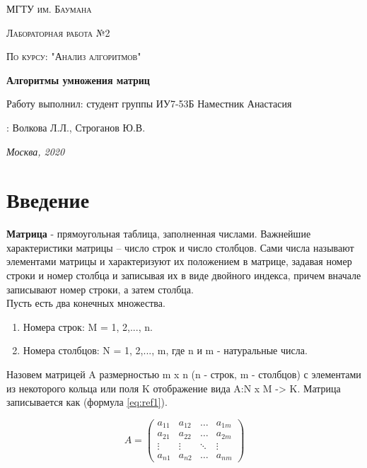 \documentclass[12pt]{report}
\begin{document}
 
\begin{titlepage}
	\centering
	{\scshape\LARGE МГТУ им. Баумана \par}
	\vspace{3cm}
	{\scshape\Large Лабораторная работа №2\par}
	\vspace{0.5cm}	
	{\scshape\Large По курсу: "Анализ алгоритмов"\par}
	\vspace{1.5cm}
	{\huge\bfseries Алгоритмы умножения матриц\par}
	\vspace{2cm}
	\Large Работу выполнил: студент группы ИУ7-53Б Наместник Анастасия\par
	\vspace{0.5cm}
	:  Волкова Л.Л., Строганов Ю.В.\par

	\vfill
	\large \textit {Москва, 2020} \par
\end{titlepage}

\tableofcontents

\newpage
\chapter*{Введение}

\textbf{            		Матрица} - прямоугольная таблица, заполненная числами. Важнейшие характеристики матрицы – число строк и число столбцов. Сами числа называют элементами матрицы и характеризуют их положением в матрице, задавая номер строки и номер столбца и записывая их в виде двойного индекса, причем вначале записывают номер строки, а затем столбца. \\

Пусть есть два конечных множества.

\begin{enumerate}
	\item Номера строк: M = {1, 2,..., n}.
	\item Номера столбцов: N =  {1, 2,..., m}, где n и m - натуральные числа.
\end{enumerate}
Назовем матрицей A  размерностью m x n (n - строк, m - столбцов) с элементами из некоторого кольца или поля K  отображение вида A:N x M -> K. Матрица записывается как (формула \ref{eq:ref1}).

\begin{equation}
	A = \left(
	\begin{array}{cccc}
			a_{11} & a_{12} & \ldots & a_{1m} \\
			a_{21} & a_{22} & \ldots & a_{2m} \\
			\vdots & \vdots & \ddots & \vdots \\
			a_{n1} & a_{n2} & \ldots & a_{nm}
		\end{array}
	\right)
	\label{eq:ref1}
\end{equation}
\end{document}
